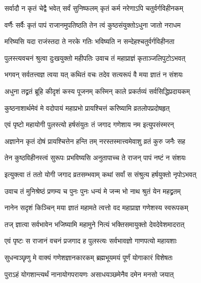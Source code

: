 \twolineshloka
{सर्वादौ न कृतं चेद्वै भवेत् सर्वं सुनिष्फलम्}
{कृतं कर्म नरेणाऽपि चतुर्वर्गविहीनकम्} %

\twolineshloka
{वर्णैः सर्वैः कृतं पापं राजानमुपतिष्ठति}
{तेन त्वं कुष्ठसंयुक्तोऽधुना जातो नराधम} %

\twolineshloka
{मरिष्यसि यदा राजंस्तदा ते नरके गतिः}
{भविष्यति न सन्देहश्चतुर्वर्गविहीनता} %

\twolineshloka
{पुलस्त्यवचनं श्रुत्वा दुःखयुक्तो महीपतिः}
{उवाच तं महाप्राज्ञं कृताञ्जलिपुटोऽभवत्} %


\twolineshloka
{भगवन् सर्वतत्त्वज्ञ त्वया यत् कथितं वचः}
{तदेव सत्यरूपं वै मया ज्ञातं न संशयः} %

\twolineshloka
{अधुना तद्व्रतं ब्रूहि कीदृशं कस्य पूजनम्}
{कस्मिन् काले प्रकर्तव्यं सर्वसिद्धिप्रदायकम्} %

\twolineshloka
{कुष्ठनाशार्थमेवं मे वदोपायं महाप्रभो}
{प्रायश्चित्तं करिष्यामि व्रतलोपप्रदोषहृत्} %

\twolineshloka
{एवं पृष्टो महायोगी पुलस्त्यो हर्षसंयुतः}
{तं जगाद गणेशाय नम इत्युपसंस्मरन्} %


\twolineshloka
{अज्ञानेन कृतं दोषं प्रायश्चित्तेन हन्ति तम्}
{नरस्तस्मात्त्वमेवाशु व्रतं कुरु जनैः सह} %

\twolineshloka
{तेन कुष्ठविहीनस्त्वं सुरूपः प्रभविष्यसि}
{अनुतापाच्च ते राजन् पापं नष्टं न संशयः} %

\twolineshloka
{इत्युक्त्वा तं ततो योगी जगाद व्रतसम्भवाम्}
{कथां सर्वां स संश्रुत्य हर्षयुक्तो नृपोऽभवत्} %

\twolineshloka
{उवाच तं मुनिश्रेष्ठं प्रणम्य च पुनः पुनः}
{धन्यं मे जन्म भो नाथ श्रुतं येन महद्व्रतम्} %

\twolineshloka
{नानेन सदृशं किञ्चिन् मया ज्ञातं महामते}
{त्वत्तो वद महाप्राज्ञ गणेशस्य स्वरूपकम्} %

\twolineshloka
{तज् ज्ञात्वा सर्वभावेन भजिष्यामि महामुने}
{नित्यं भक्तिसमायुक्तो देवदेवेशमादरात्} %

\twolineshloka
{एवं पृष्टः स राजानं वचनं प्रजगाद ह}
{पुलस्त्यः सर्वभावज्ञो गाणपत्यो महायशाः} %


\twolineshloka
{सुधन्वञ्छृणु मे वाक्यं गणेशज्ञानकारकम्}
{ब्रह्मभूयमयं पूर्णं योगाकारं विशेषतः} %

\twolineshloka
{पुराऽहं योगशान्त्यर्थं नानायोगपरायणः}
{असाधयञ्छमेनैव दमेन मनसो जयात्} %


